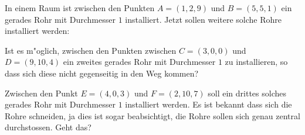 In einem Raum ist zwischen den Punkten $A=(1,2,9)$ und $B=(5,5,1)$
ein gerades Rohr mit Durchmesser $1$ installiert.
Jetzt sollen weitere solche Rohre installiert werden:
\begin{teilaufgaben}
\item
Ist es m"oglich, zwischen den Punkten zwischen $C=(3,0,0)$ und $D=(9,10,4)$
ein zweites gerades Rohr mit Durchmesser $1$ zu installieren, so dass sich
diese nicht gegenseitig in den Weg kommen?
\item
Zwischen den Punkt $E=(4,0,3)$ und $F=(2,10,7)$ soll ein drittes
solches gerades Rohr mit Durchmesser $1$ installiert werden.
Es ist bekannt dass sich die Rohre schneiden, ja dies ist sogar 
beabsichtigt, die Rohre sollen sich genau zentral durchstossen.
Geht das?
\end{teilaufgaben}

